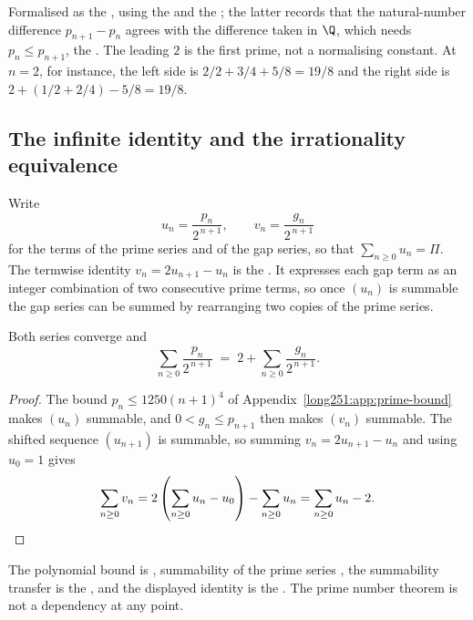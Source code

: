 \noindent Formalised as the
, using the
 and the
; the latter records that the natural-number difference
$p_{n+1}-p_n$ agrees with the difference taken in $\Q$, which needs
$p_n\le p_{n+1}$, the
.  The leading $2$ is the first prime, not a normalising constant.
At $n=2$, for instance, the left side is $2/2+3/4+5/8=19/8$ and the right side
is $2+(1/2+2/4)-5/8=19/8$.

\subsection{The infinite identity and the irrationality equivalence}\label{long251:sec:infinite}

Write
\[
 u_n=\frac{p_n}{2^{\,n+1}},\qquad
 v_n=\frac{g_n}{2^{\,n+1}}
\]
for the terms of the prime series and of the gap series, so that
$\sum_{n\ge0}u_n=\Pi$.  The termwise identity $v_n=2u_{n+1}-u_n$ is the
.  It expresses each gap term as an integer combination of
two consecutive prime terms, so once $(u_n)$ is summable the gap series can be
summed by rearranging two copies of the prime series.

\begin{theorem}\label{long251:res:infinite}
Both series converge and
\[
 \sum_{n\ge0}\frac{p_n}{2^{\,n+1}}
 \;=\;2+\sum_{n\ge0}\frac{g_n}{2^{\,n+1}} .
\]
\end{theorem}

\begin{proof}
The bound $p_n\le1250(n+1)^4$ of Appendix~\ref{long251:app:prime-bound} makes $(u_n)$
summable, and $0<g_n\le p_{n+1}$ then makes $(v_n)$ summable.  The shifted
sequence $(u_{n+1})$ is summable, so summing $v_n=2u_{n+1}-u_n$ and using
$u_0=1$ gives
\[
 \sum_{n\ge0}v_n
 =2\left(\sum_{n\ge0}u_n-u_0\right)-\sum_{n\ge0}u_n
 =\sum_{n\ge0}u_n-2 . \qedhere
\]
\end{proof}

\noindent The polynomial bound is
, summability of the prime series
,
the summability transfer is the
, and the displayed identity is the
.  The prime number theorem is not a dependency at any
point.

